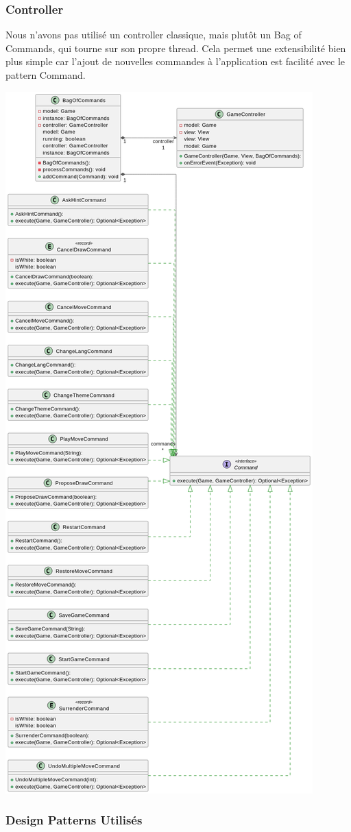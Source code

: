 \documentclass{article}
\begin{document}
\subsubsection{Controller}
Nous n'avons pas utilisé un controller classique, mais plutôt un Bag of Commands, qui tourne sur son propre thread. Cela permet une extensibilité
bien plus simple car l'ajout de nouvelles commandes à l'application est facilité avec le pattern Command.

\begin{center}
    \includegraphics[height=\textwidth]{uml_controller}
\end{center}

\subsubsection{Design Patterns Utilisés}
\end{document}
